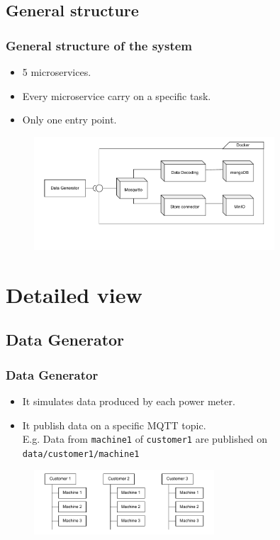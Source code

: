 \subsection{General structure}
\begin{frame}
	\frametitle{General structure of the system}
	
	\begin{itemize}
		\item 5 microservices.
		\item Every microservice carry on a specific task.
		\item Only one entry point.
	\end{itemize}
	
	\begin{figure}[h]
		\centering
		\includegraphics[width=0.8\textwidth]{./drawings/general_scheme.pdf}
	\end{figure}
\end{frame}


\section{Detailed view}

\subsection{Data Generator}
\begin{frame}
	\frametitle{Data Generator}
	
	\begin{itemize}
		\item It simulates data produced by each power meter.
		\item It publish data on a specific MQTT topic.\\
			E.g. Data from \texttt{machine1} of \texttt{customer1} are published on \texttt{data/customer1/machine1}
	\end{itemize}
	
	\bigskip
	\begin{figure}[h]
		\centering
		\includegraphics[width=0.6\textwidth]{./drawings/MachinesHierarchy.pdf}
	\end{figure}
\end{frame}


